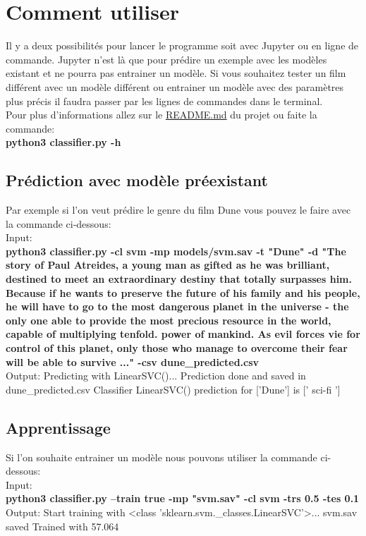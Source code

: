 \newpage
\section{Comment utiliser}

Il y a deux possibilités pour lancer le programme soit avec Jupyter ou en ligne de commande. Jupyter n'est là que pour prédire un exemple avec les modèles existant et ne pourra pas entrainer un modèle. Si vous souhaitez tester un film différent avec un modèle différent ou entrainer un modèle avec des paramètres plus précis il faudra passer par les lignes de commandes dans le terminal. \\ 

Pour plus d'informations allez sur le \href{https://github.com/margauxschmied/TATIA/blob/main/README.md}{README.md} du projet ou faite la commande: \\
\textbf{python3 classifier.py -h}

\subsection{Prédiction avec modèle préexistant}

Par exemple si l'on veut prédire le genre du film Dune vous pouvez le faire avec la commande ci-dessous: \\

Input: \\
\textbf{python3 classifier.py -cl svm -mp models/svm.sav -t "Dune" -d "The story of Paul Atreides, a young man as gifted as he was brilliant, destined to meet an extraordinary destiny that totally surpasses him. Because if he wants to preserve the future of his family and his people, he will have to go to the most dangerous planet in the universe - the only one able to provide the most precious resource in the world, capable of multiplying tenfold. power of mankind. As evil forces vie for control of this planet, only those who manage to overcome their fear will be able to survive ..." -csv dune\_predicted.csv} \\

Output: 
Predicting with LinearSVC()...
Prediction done and saved in dune_predicted.csv
Classifier LinearSVC() prediction for ['Dune'] is [' sci-fi ']
\END



\subsection{Apprentissage}

Si l'on souhaite entrainer un modèle nous pouvons utiliser la commande ci-dessous: \\

Input: \\
\textbf{python3 classifier.py --train true -mp "svm.sav" -cl svm -trs 0.5 -tes 0.1} \\

Output:
Start training with <class 'sklearn.svm._classes.LinearSVC'>...
svm.sav saved
Trained with 57.064%
\END
